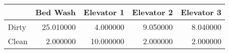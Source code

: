 \begin{tabular}{lrrrr}
\toprule
 & Bed Wash & Elevator 1 & Elevator 2 & Elevator 3 \\
\midrule
Dirty & 25.010000 & 4.000000 & 9.050000 & 8.040000 \\
Clean & 2.000000 & 10.000000 & 2.000000 & 2.000000 \\
\bottomrule
\end{tabular}
